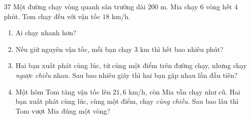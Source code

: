 \begin{probbox}{37}{}
Một đường chạy vòng quanh sân trường dài $200$ m. Mia chạy $6$ vòng hết $4$ phút. Tom chạy đều với vận tốc $18$ km/h.
\begin{enumerate}[label=\alph*),leftmargin=1.6em,itemsep=0pt,topsep=2pt]
  \item Ai chạy nhanh hơn?
  \item Nếu giữ nguyên vận tốc, mỗi bạn chạy $3$ km thì hết bao nhiêu phút?
  \item Hai bạn xuất phát cùng lúc, từ cùng một điểm trên đường chạy, nhưng chạy \emph{ngược chiều} nhau. Sau bao nhiêu
  giây thì hai bạn gặp nhau lần đầu tiên?
  \item Một hôm Tom tăng vận tốc lên $21{,}6$ km/h, còn Mia vẫn chạy như cũ. Hai bạn xuất phát cùng lúc, cùng một điểm, chạy
  \emph{cùng chiều}. Sau bao lâu thì Tom vượt Mia đúng một vòng?
\end{enumerate}
\end{probbox}
